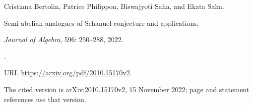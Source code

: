 Cristiana Bertolin, Patrice Philippon, Biswajyoti Saha, and Ekata Saha.

\newblock Semi-abelian analogues of {Schanuel} conjecture and applications.

\newblock \emph{Journal of Algebra}, 596: 250--288, 2022.

\newblock {}.

\newblock URL \url{https://arxiv.org/pdf/2010.15170v2}.

\newblock The cited version is arXiv:2010.15170v2, 15 November 2022; page and statement references use that version.

